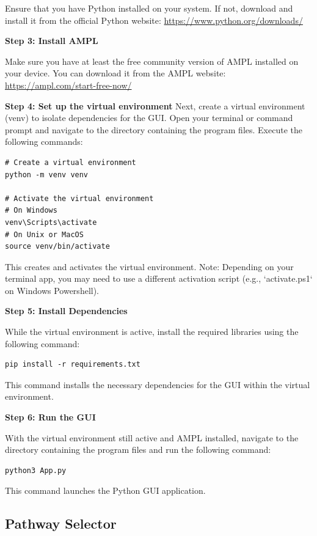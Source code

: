 Ensure that you have Python installed on your system. If not, download and install it from the official Python website: \url{https://www.python.org/downloads/}

\textbf{Step 3: Install AMPL}

Make sure you have at least the free community version of AMPL installed on your device. You can download it from the AMPL website: \url{https://ampl.com/start-free-now/}

\textbf{Step 4: Set up the virtual environment}
Next, create a virtual environment (venv) to isolate dependencies for the GUI. Open your terminal or command prompt and navigate to the directory containing the program files. Execute the following commands:

\begin{verbatim}
# Create a virtual environment
python -m venv venv

# Activate the virtual environment
# On Windows
venv\Scripts\activate
# On Unix or MacOS
source venv/bin/activate
\end{verbatim}

This creates and activates the virtual environment. Note: Depending on your terminal app, you may need to use a different activation script (e.g., `activate.ps1` on Windows Powershell).

\textbf{Step 5: Install Dependencies}

While the virtual environment is active, install the required libraries using the following command:

\begin{verbatim}
pip install -r requirements.txt
\end{verbatim}

This command installs the necessary dependencies for the GUI within the virtual environment.


\textbf{Step 6: Run the GUI}

With the virtual environment still active and AMPL installed, navigate to the directory containing the program files and run the following command:

\begin{verbatim}
python3 App.py
\end{verbatim}

This command launches the Python GUI application.

\subsection{Pathway Selector}

